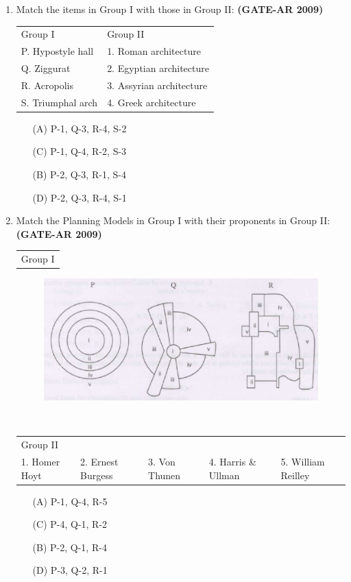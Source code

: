 \documentclass[a4paper,10pt]{article}
\begin{document}
\begin{enumerate}
    \item Match the items in Group I with those in Group II: \hfill \textbf{(GATE-AR 2009)} \\
    \begin{tabular}{ p p }
	Group I & Group II \\
	P. Hypostyle hall & 1. Roman architecture \\
	Q. Ziggurat & 2. Egyptian architecture \\
	R. Acropolis & 3. Assyrian architecture \\
	S. Triumphal arch & 4. Greek architecture \\
	\end{tabular}
	\begin{multicols}{2}
	\begin{itemize}
        \item[(A)] P-1, Q-3, R-4, S-2
        \item[(C)] P-1, Q-4, R-2, S-3
        \item[(B)] P-2, Q-3, R-1, S-4
        \item[(D)] P-2, Q-3, R-4, S-1
    \end{itemize}
	\end{multicols}

    \item Match the Planning Models in Group I with their proponents in Group II: \hfill \textbf{(GATE-AR 2009)} \\
    \begin{tabular}{ p }
	Group I \\
	\end{tabular}
	\begin{figure}[h!]
        \centering
        \includegraphics[width=0.5\linewidth]{figs/img_03.jpg}
        \label{fig:Img03}
	\end{figure} \\
	\begin{tabular}{ p p p p p }
	Group II & & \\
	1. Homer Hoyt & 2. Ernest Burgess & 3. Von Thunen & 4. Harris \& Ullman & 5. William Reilley \\
	\end{tabular}
	\begin{multicols}{2}
	\begin{itemize}
        \item[(A)] P-1, Q-4, R-5
        \item[(C)] P-4, Q-1, R-2
        \item[(B)] P-2, Q-1, R-4
        \item[(D)] P-3, Q-2, R-1
    \end{itemize}
	\end{multicols}


\end{enumerate}
\end{document}
